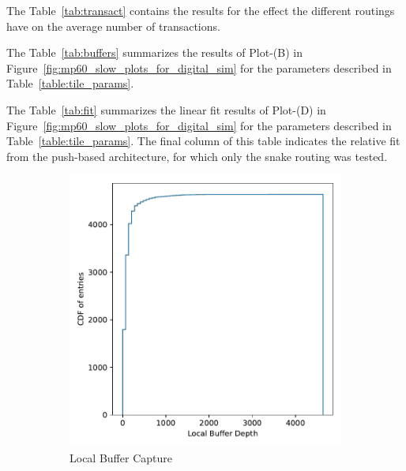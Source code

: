 The Table~\ref{tab:transact} contains the results for the effect the different routings have on the average number of transactions.

The Table~\ref{tab:buffers} summarizes the results of Plot-(B) in Figure~\ref{fig:mp60_slow_plots_for_digital_sim} for the parameters described in Table~\ref{table:tile_params}.

The Table~\ref{tab:fit} summarizes the linear fit results of Plot-(D) in Figure~\ref{fig:mp60_slow_plots_for_digital_sim} for the parameters described in Table~\ref{table:tile_params}.
The final column of this table indicates the relative fit from the push-based architecture, for which only the snake routing was tested.

\begin{figure}
  \centering
  \begin{subfigure}[b]{0.475\textwidth}
      \centering
      \includegraphics[width=\textwidth]{./images/mp60_16_slow_local_stack.pdf}
      \caption[]%
      {{\small Local Buffer Capture}}    
  \end{subfigure}
  \hfill
  \begin{subfigure}[b]{0.475\textwidth}  
      \centering 

\end{subfigure}
\end{figure}
